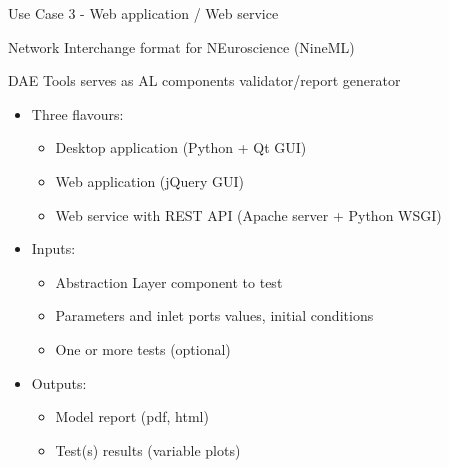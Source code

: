 \documentclass[compress,newPxFont,sthlmFooter]{beamer}
\begin{document}
\begin{frame}[plain]{Use Case 3 - Web application / Web service}
    \begin{center}
        \alert{Network Interchange format for NEuroscience (NineML)}
    \end{center}   
    \small{DAE Tools serves as \alert{AL components validator/report generator}}
    
    \begin{itemize}
        \item Three flavours:
        \begin{itemize}
            \item \alert{Desktop application} (Python + Qt GUI)
            \item \alert{Web application} (jQuery GUI)
            \item \alert{Web service} with REST API (Apache server + Python WSGI)
        \end{itemize}
        \item Inputs:
            \begin{itemize}
                \item Abstraction Layer component to test
                \item Parameters and inlet ports values, initial conditions
                \item One or more tests (optional)
            \end{itemize}
        \item Outputs:
            \begin{itemize}
                \item Model report (pdf, html)
                \item Test(s) results (variable plots)
            \end{itemize}
    \end{itemize}
\end{frame}
\end{document}
